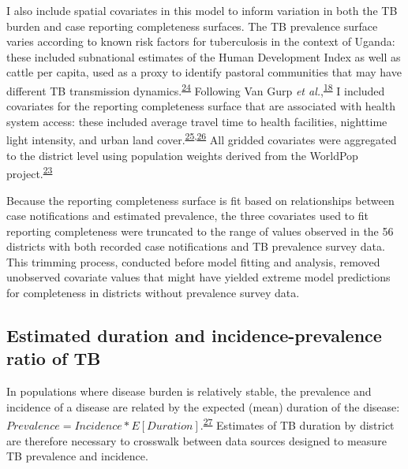 \documentclass[
]{article}
\begin{document}
I also include spatial covariates in this model to inform variation in both the TB burden and case reporting completeness surfaces. The TB prevalence surface varies according to known risk factors for tuberculosis in the context of Uganda: these included subnational estimates of the Human Development Index as well as cattle per capita, used as a proxy to identify pastoral communities that may have different TB transmission dynamics.\textsuperscript{\protect\hyperlink{ref-UgandaNationalTuberculosisandLeprosyProgramme2020a}{24}} Following Van Gurp \emph{et al.},\textsuperscript{\protect\hyperlink{ref-VanGurp2020}{18}} I included covariates for the reporting completeness surface that are associated with health system access: these included average travel time to health facilities, nighttime light intensity, and urban land cover.\textsuperscript{\protect\hyperlink{ref-Weiss2020}{25},\protect\hyperlink{ref-Thomson2019}{26}} All gridded covariates were aggregated to the district level using population weights derived from the WorldPop project.\textsuperscript{\protect\hyperlink{ref-Tatem2017}{23}}

Because the reporting completeness surface is fit based on relationships between case notifications and estimated prevalence, the three covariates used to fit reporting completeness were truncated to the range of values observed in the 56 districts with both recorded case notifications and TB prevalence survey data. This trimming process, conducted before model fitting and analysis, removed unobserved covariate values that might have yielded extreme model predictions for completeness in districts without prevalence survey data.

\hypertarget{estimated-duration-and-incidence-prevalence-ratio-of-tb}{%
\subsection{Estimated duration and incidence-prevalence ratio of TB}\label{estimated-duration-and-incidence-prevalence-ratio-of-tb}}

In populations where disease burden is relatively stable, the prevalence and incidence of a disease are related by the expected (mean) duration of the disease: \(Prevalence = Incidence * E[Duration]\).\textsuperscript{\protect\hyperlink{ref-Freeman1980}{27}} Estimates of TB duration by district are therefore necessary to crosswalk between data sources designed to measure TB prevalence and incidence.
\end{document}
